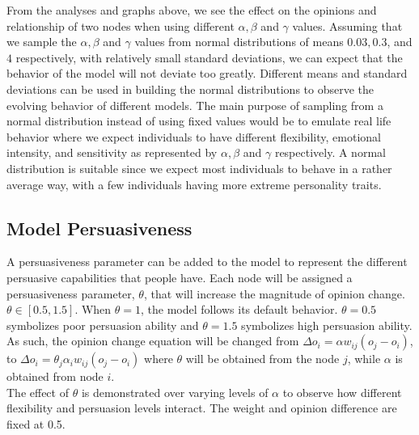\documentclass[11pt]{article}
\begin{document}
From the analyses and graphs above, we see the effect on the opinions
and relationship of two nodes when using different \(\alpha,\beta\) and
\(\gamma\) values. Assuming that we sample the \(\alpha,\beta\) and
\(\gamma\) values from normal distributions of means \(0.03,0.3\), and
\(4\) respectively, with relatively small standard deviations, we can
expect that the behavior of the model will not deviate too greatly.
Different means and standard deviations can be used in building the
normal distributions to observe the evolving behavior of different
models. The main purpose of sampling from a normal distribution instead
of using fixed values would be to emulate real life behavior where we
expect individuals to have different flexibility, emotional intensity,
and sensitivity as represented by \(\alpha,\beta\) and \(\gamma\)
respectively. A normal distribution is suitable since we expect most
individuals to behave in a rather average way, with a few individuals
having more extreme personality traits.

    \subsection{Model Persuasiveness}

A persuasiveness parameter can be added to the model to represent the
different persuasive capabilities that people have. Each node will be
assigned a persuasiveness parameter, \(\theta\), that will increase the
magnitude of opinion change. \(\theta \in [0.5,1.5]\). When
\(\theta = 1\), the model follows its default behavior. \(\theta=0.5\)
symbolizes poor persuasion ability and \(\theta=1.5\) symbolizes high
persuasion ability.\\

As such, the opinion change equation will be changed from
\(\Delta o_i = \alpha w_{ij}(o_j - o_i)\), to
\(\Delta o_i = \theta_j\alpha_i w_{ij}(o_j - o_i)\) where \(\theta\)
will be obtained from the node \(j\), while \(\alpha\) is obtained from
node \(i\).\\

The effect of \(\theta\) is demonstrated over varying levels of
\(\alpha\) to observe how different flexibility and persuasion levels
interact. The weight and opinion difference are fixed at 0.5.
\end{document}

